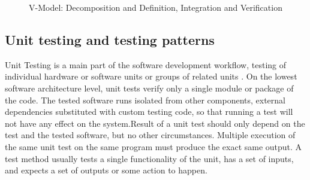 \begin{figure}

\centering
{}

\caption{V-Model: Decomposition and Definition, Integration and Verification} 
\label{fig:vmodel}
\end{figure}
\subsection{Unit testing and testing patterns}
Unit Testing is a main part of the software development workflow, testing of individual hardware or software units or groups of related units \cite{159342}. On the lowest software architecture level, unit tests verify only a single module or package of the code. The tested software runs isolated from other components, external dependencies substituted with custom testing code, so that running a test will not have any effect on the system.Result of a unit test should only depend on the test and the tested software, but no other circumstances. Multiple execution of the same unit test on the same program must produce the exact same output. A test method usually tests a single functionality of the unit, has a set of inputs, and expects a set of outputs or some action to happen.

